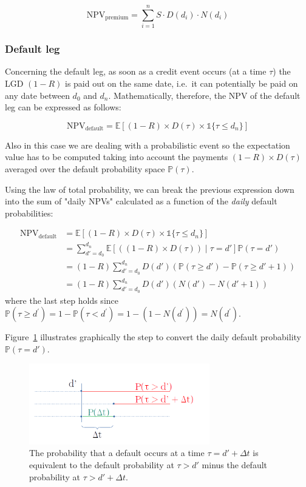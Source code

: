 \[\mathrm{NPV_{premium}} = \sum_{i=1}^{n} S \cdot D(d_i) \cdot N(d_i)\]

\subsubsection{Default leg}\label{default-leg}

Concerning the default leg, as soon as a credit event occurs (at a time $\tau$) the LGD \((1-R)\) is paid out on the same date, i.e.~it can potentially be paid on any date between \(d_0\) and \(d_n\). Mathematically, therefore, the NPV of the default leg can be expressed as follows:

\[
\mathrm{NPV_{default}} =\mathbb{E}[(1-R) \times D(\tau) \times \mathbb{1} \{\tau \leq d_n\} ]
\]

Also in this case we are dealing with a probabilistic event so the expectation value has to be computed taking into account the payments $(1-R)\times D(\tau)$ averaged over the default probability space $\mathbb{P}(\tau)$. 

Using the law of total probability, we can break the previous expression down into the sum
of "daily NPVs" calculated as a function of the \emph{daily} default
probabilities:

\begin{align*}
\mathrm{NPV_{default}} &= \mathbb{E}[(1-R) \times D(\tau) \times \mathbb{1}\{\tau \leq d_n\} ] \\
&= \sum_{d'=d_0}^{d_n} \mathbb{E}[ ((1-R) \times D(\tau)) \mid \tau = d'] \mathbb{P}(\tau = d') \\
&= (1-R) \sum_{d'=d_0}^{d_n} D(d') \left(\mathbb{P}(\tau \geq d') - \mathbb{P}( \tau \geq d'+1) \right) \\
&= (1-R) \sum_{d'=d_0}^{d_n} D(d') \left( N(d') - N(d'+1) \right)
\end{align*}
where the last step holds since $\mathbb{P}(\tau\geq d^{'}) = 1 - \mathbb{P}(\tau < d^{'}) = 1 - (1-N(d^{'})) = N(d^{'})$. 

Figure~\ref{fig:default_p} illustrates graphically the step to convert the daily default probability $\mathbb{P}(\tau=d')$.

\begin{figure}[htb]
	\centering
	\includegraphics[width=0.7\textwidth]{figures/timeline.png}
	\caption{The probability that a default occurs at a time $\tau = d'+\Delta t$ is equivalent to the default probability at $\tau > d'$ minus the default probability at $\tau>d'+\Delta t$.}
	\label{fig:default_p}
\end{figure}

